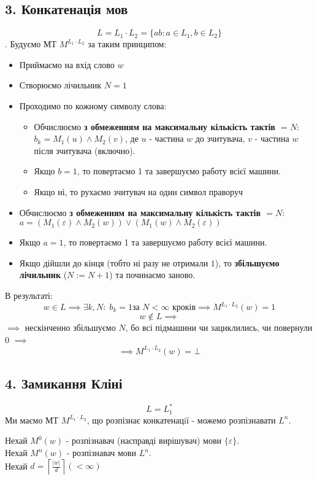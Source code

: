 \documentclass[11pt, a4paper]{article} %
\begin{document}
\subsection*{3. Конкатенація мов}
$$L = L_1 \cdot L_2 = \{ab : a \in L_1, b \in L_2\}$$.
Будуємо МТ $M^{L_1 \cdot L_2}$ за таким принципом:
\begin{itemize}
    \item Приймаємо на вхід слово $w$
    \item Створюємо лічильник $N = 1$
    \item Проходимо по кожному символу слова:
    \begin{itemize}
        \item Обчислюємо \textbf{з обмеженням на максимальну кількість тактів $=N$}:\\
        $b_k = M_1(u) \wedge M_2(v)$, де $u$ - частина $w$ до зчитувача, $v$ - частина $w$ після зчитувача (включно).
        \item Якщо $b = 1$, то повертаємо 1 та завершуємо работу всієї машини.
        \item Якщо ні, то рухаємо зчитувач на один символ праворуч
    \end{itemize}
    \item Обчислюємо \textbf{з обмеженням на максимальну кількість тактів $=N$}:\\
    $a = \left(M_1(\varepsilon) \wedge M_2(w)\right) \vee \left(M_1(w) \wedge M_2(\varepsilon)\right)$ 
    \item Якщо $a = 1$, то повертаємо 1 та завершуємо работу всієї машини.
    \item Якщо дійшли до кінця (тобто ні разу не отримали $1$), то \textbf{збільшуємо лічильник} ($N := N+1$) та починаємо заново.
\end{itemize}

В результаті:
$$w \in L \implies \exists k,N:\; b_k=1 \text{за $N<\infty$ кроків} \implies M^{L_1 \cdot L_2}(w) = 1$$
$$w \notin L \implies $$
$\implies$ нескінченно збільшуємо $N$, бо всі підмашини чи зациклились, чи повернули $0$ $\implies$ 
$$\implies M^{L_1 \cdot L_2}(w) = \bot$$

\qedsymbol

\subsection*{4. Замикання Кліні}
$$L = L_1^*$$
Ми маємо МТ $M^{L_1\cdot L_2}$, що розпізнає конкатенацiї - можемо розпізнавати $L^n$.

Нехай $M^0(w)$ - розпізнавач (насправді вирішувач) мови $\{\varepsilon\}$.\\
Нехай $M^n(w)$ - розпізнавач мови $L^n$.\\
Нехай $d = \left\lceil\frac{|w|}{d}\right\rceil (< \infty)$
\end{document}
